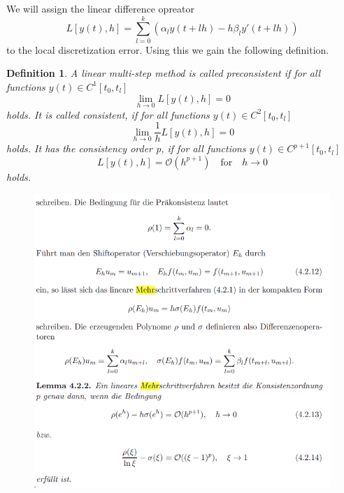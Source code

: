 \documentclass[11pt,titlepage]{article}
\newtheorem{definition}{Definition}
\begin{document}
				We will assign the linear difference opreator
				\begin{equation}
					L[y(t),h] = \sum_{l=0}^{k} \left( \alpha_l y(t+lh) - h \beta_l y'(t+lh) \right)
				\end{equation}
				to the local discretization error. Using this we gain the following definition.
			
				\begin{definition}
					A linear multi-step method is called \emph{preconsistent} if for all functions $y(t) \in C^1[t_0,t_l]$
					\begin{displaymath}
						\lim\limits_{h \to 0} L[y(t),h]=0
					\end{displaymath}
					holds. It is called \emph{consistent}, if for all functions $y(t) \in C^2[t_0,t_l]$
					\begin{displaymath}
						\lim\limits_{h \to 0} \frac{1}{h} L[y(t),h] = 0
					\end{displaymath}
					holds. It has the \emph{consistency order p}, if for all functions $y(t) \in C^{p+1}[t_0, t_l]$
					\begin{displaymath}
						L[y(t),h] = \mathcal{O}(h^{p+1}) \quad \text{for} \quad h \to 0
					\end{displaymath}
					holds.
				\end{definition}

				\begin{figure}[H]
					\centering
					\includegraphics[width=0.7\linewidth]{screenshot014}
					\caption{}
					\label{fig:screenshot014}
				\end{figure}
				
\end{document}
